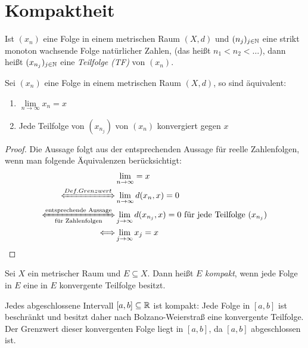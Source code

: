 \section{Kompaktheit}

\begin{Definition}%
	Ist $(x_n)$ eine Folge in einem metrischen Raum $(X,d)$ und $(n_j)_{j \in \mathbb{N}}$ 
	eine strikt monoton wachsende Folge natürlicher Zahlen, (das heißt \mbox{$n_1 < n_2 
	< \hdots$}), dann heißt $(x_{n_j})_{j \in \mathbb{N}}$ eine \emph{Teilfolge (TF)} von 
	$(x_n)$.
\end{Definition}

\begin{Proposition}\label{vl_25_prop_1}%
	Sei $(x_n)$ eine Folge in einem metrischen Raum $(X,d)$, so sind äquivalent:
	\begin{enumerate}
		\item \label{vl_25_stp_1}$\lim\limits_{n \rightarrow \infty}{x_n} = x$
		\item \label{vl_25_stp_2} Jede Teilfolge von $(x_{n_j})$ von $(x_n)$ 
			konvergiert gegen $x$
	\end{enumerate}
\end{Proposition}

\begin{proof}
	Die Aussage folgt aus der entsprechenden Aussage für reelle Zahlenfolgen, wenn 
	man folgende Äquivalenzen berücksichtigt:
	\begin{align*}
		&\lim\limits_{n \rightarrow \infty} = x \\
		\xLeftrightarrow{Def. Grenzwert} &
			\lim\limits_{n\rightarrow\infty}d(x_n,x)=0 \\
		\xLeftrightarrow[\text{für Zahlenfolgen}]{\text{entsprechende Aussage}} 
			& \lim\limits_{j\rightarrow \infty}d(x_{n_j},x) = 0 
			\text{ für jede Teilfolge } (x_{n_j}) \\
		\Longleftrightarrow & \lim\limits_{j \rightarrow \infty} x_j = x
	\end{align*}
\end{proof}

\begin{Definition}%
	Sei $X$ ein metrischer Raum und $E \subseteq X$. Dann heißt $E$ \emph{kompakt}, 
	wenn jede Folge in $E$ eine in $E$ konvergente Teilfolge besitzt.
\end{Definition}

\begin{Beispiel}	
	Jedes abgeschlossene Intervall $[a,b] \subseteq \mathbb{R}$ ist kompakt: 
	Jede Folge in $[a,b]$ ist beschränkt und besitzt daher nach Bolzano-Weierstraß 
	eine konvergente Teilfolge. Der Grenzwert dieser konvergenten Folge liegt in 
	$[a,b]$, da $[a,b]$ abgeschlossen ist.
\end{Beispiel}
 
